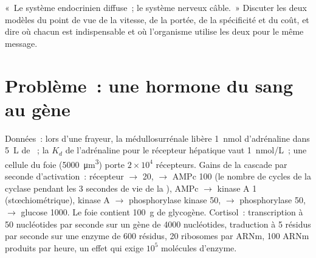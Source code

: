 \begin{exercise}[$\star\star\star$]\label{exo:b2:cell-signalling:12}
«~Le système endocrinien diffuse~; le système nerveux câble.~» Discuter
les deux modèles du point de vue de la vitesse, de la portée, de la
spécificité et du coût, et dire où chacun est indispensable et où
l'organisme utilise les deux pour le même message.
\end{exercise}

\section{Problème~: une hormone du sang au gène}

\begin{problem}
\label{pb:b2:cell-signalling:1}
Données~: lors d'une frayeur, la médullosurrénale libère \qty{1}{nmol}
d'adrénaline dans \qty{5}{L} de ~; la $K_d$ de l'adrénaline pour le
récepteur hépatique vaut \qty{1}{nmol/L}~; une cellule du foie
(\qty{5000}{\micro m^3}) porte $2\times 10^{4}$ récepteurs. Gains de la
cascade par seconde d'activation~: récepteur $\to$  20,
 $\to$ AMPc 100 (le nombre de cycles de la cyclase pendant les
3 secondes de vie de la ), AMPc $\to$ kinase A 1
(stœchiométrique), kinase A $\to$ phosphorylase kinase 50, $\to$
phosphorylase 50, $\to$ glucose 1000. Le foie contient \qty{100}{g} de
glycogène. Cortisol~: transcription à \qty{50}{} nucléotides par seconde
sur un gène de \qty{4000}{} nucléotides, traduction à \qty{5}{} résidus
par seconde sur une enzyme de \num{600} résidus, \num{20} ribosomes par
ARNm, \num{100} ARNm produits par heure, un effet qui exige $10^{5}$
molécules d'enzyme.


\end{problem}
